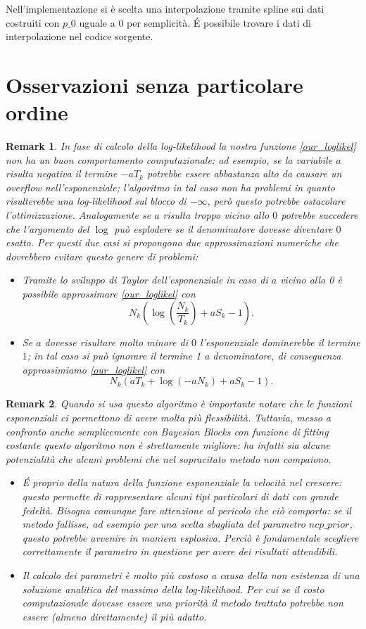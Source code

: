 \documentclass[10pt,a4paper]{report}
\newtheorem{remark}{Remark}
\begin{document}
Nell'implementazione si è scelta una interpolazione tramite spline sui dati costruiti con $p\_0$ uguale a $0$ per semplicità. \'E possibile trovare i dati di interpolazione nel codice sorgente.

\section{Osservazioni senza particolare ordine}
\begin{remark}
In fase di calcolo della log-likelihood la nostra funzione \eqref{our_loglikel} non ha un buon comportamento computazionale: ad esempio, se la variabile $a$ risulta negativa il termine $-aT_k$ potrebbe essere abbastanza alto da causare un overflow nell'esponenziale; l'algoritmo in tal caso non ha problemi in quanto risulterebbe una log-likelihood sul blocco di $-\infty$, però questo potrebbe ostacolare l'ottimizzazione. Analogamente se $a$ risulta troppo vicino allo $0$ potrebbe succedere che l'argomento del $\log$ può esplodere se il denominatore dovesse diventare $0$ esatto. Per questi due casi si propongono due approssimazioni numeriche che dovrebbero evitare questo genere di problemi:
\begin{itemize}
\item Tramite lo sviluppo di Taylor dell'esponenziale in caso di $a$ vicino allo 0 è possibile approssimare \eqref{our_loglikel} con
$$
N_k\left(\log\left(\frac{N_k}{T_k}\right)+aS_k-1\right).
$$
\item Se $a$ dovesse risultare molto minore di $0$ l'esponenziale dominerebbe il termine $1$; in tal caso si può ignorare il termine 1 a denominatore, di conseguenza approssimiamo \eqref{our_loglikel} con 
$$
N_k\left(aT_k+\log(-aN_k)+aS_k-1\right).
$$
\end{itemize}
\end{remark}
\begin{remark}
Quando si usa questo algoritmo è importante notare che le funzioni esponenziali ci permettono di avere molta più flessibilità. Tuttavia, messo a confronto anche semplicemente con Bayesian Blocks con funzione di fitting costante questo algoritmo non è strettamente migliore: ha infatti sia alcune potenzialità che alcuni problemi che nel sopracitato metodo non compaiono.
\begin{itemize}
\item \'E proprio della natura della funzione esponenziale la velocità nel crescere: questo permette di rappresentare alcuni tipi particolari di dati con grande fedeltà. Bisogna comunque fare attenzione al pericolo che ciò comporta: se il metodo fallisse, ad esempio per una scelta sbagliata del parametro $ncp\_prior$, questo potrebbe avvenire in maniera esplosiva. Perciò è fondamentale scegliere correttamente il parametro in questione per avere dei risultati attendibili.
\item Il calcolo dei parametri è molto più costoso a causa della non esistenza di una soluzione analitica del massimo della log-likelihood. Per cui se il costo computazionale dovesse essere una priorità il metodo trattato potrebbe non essere (almeno direttamente) il più adatto.
\end{itemize}
\end{remark}
\end{document}
